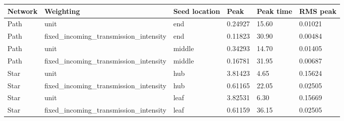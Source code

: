 \begin{tabular}{llllll}
\hline
Network & Weighting & Seed location & Peak & Peak time & RMS peak \\
\hline
Path & unit & end & 0.24927 & 15.60 & 0.01021 \\
Path & fixed_incoming_transmission_intensity & end & 0.11823 & 30.90 & 0.00484 \\
Path & unit & middle & 0.34293 & 14.70 & 0.01405 \\
Path & fixed_incoming_transmission_intensity & middle & 0.16781 & 31.95 & 0.00687 \\
Star & unit & hub & 3.81423 & 4.65 & 0.15624 \\
Star & fixed_incoming_transmission_intensity & hub & 0.61165 & 22.05 & 0.02505 \\
Star & unit & leaf & 3.82531 & 6.30 & 0.15669 \\
Star & fixed_incoming_transmission_intensity & leaf & 0.61159 & 36.15 & 0.02505 \\
\hline
\end{tabular}

